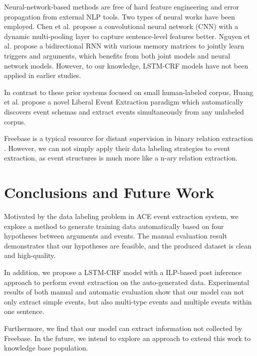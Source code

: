 \documentclass{article}
\begin{document}
Neural-network-based methods are free of hard feature engineering and error propagation from external NLP tools. Two types of neural works have been employed. Chen et al.  propose a convolutional neural network (CNN) with a dynamic multi-pooling layer to capture sentence-level features better. Nguyen et al.  propose a bidirectional RNN with various memory matrices to jointly learn triggers and arguments, which benefits from both joint models and neural network models. However, to our knowledge, LSTM-CRF models have not been applied in earlier studies.

In contrast to these prior systems focused on small human-labeled corpus, Huang et al.  propose a novel Liberal Event Extraction paradigm which automatically discovers event schemas and extract events simultaneously from any unlabeled corpus. 

Freebase is a typical resource for distant supervision in binary relation extraction \cite{mintz2009distant,zeng2015distant}. However, we can not simply apply their data labeling strategies to event extraction, as event structures is much more like a n-ary relation extraction.

\section{Conclusions and Future Work}
Motivated by the data labeling problem in ACE event extraction system, we explore a method to generate training data automatically based on four hypotheses between arguments and events. The manual evaluation result demonstrates that our hypotheses are feasible, and the produced dataset is clean and high-quality.

In addition, we propose a LSTM-CRF model with a ILP-based post inference approach to perform event extraction on the auto-generated data. Experimental results of both manual and automatic evaluation show that our model can not only extract simple events, but also multi-type events and multiple events within one sentence.

Furthermore, we find that our model can extract information not collected by Freebase. In the future, we intend to explore an approach to extend this work to knowledge base population. 




\end{document}

